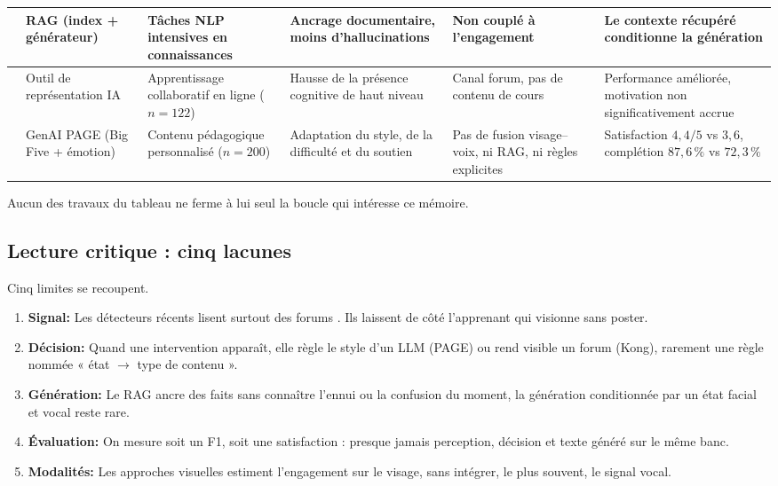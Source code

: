 {\begin{xltabular}{\textwidth}{|>{\raggedright\arraybackslash}X|>{\raggedright\arraybackslash}X|>{\raggedright\arraybackslash}X|>{\raggedright\arraybackslash}X|>{\raggedright\arraybackslash}X|>{\raggedright\arraybackslash}X|}
\textcite{lewis2020retrieval}
  & RAG (index + générateur)
  & Tâches NLP intensives en connaissances
  & Ancrage documentaire, moins d'hallucinations
  & Non couplé à l'engagement
  & Le contexte récupéré conditionne la génération \\
\hline
\textcite{kong2025exploratory}
  & Outil de représentation IA
  & Apprentissage collaboratif en ligne ($n=122$)
  & Hausse de la présence cognitive de haut niveau
  & Canal forum, pas de contenu de cours
  & Performance améliorée, motivation non significativement accrue \\
\hline
\textcite{hu2025page}
  & GenAI PAGE (Big Five + émotion)
  & Contenu pédagogique personnalisé ($n=200$)
  & Adaptation du style, de la difficulté et du soutien
  & Pas de fusion visage--voix, ni RAG, ni règles explicites
  & Satisfaction $4{,}4/5$ vs $3{,}6$, complétion $87{,}6\,\%$ vs $72{,}3\,\%$ \\
\hline
\end{xltabular}
\label{tab:ea-comparatif}
}

Aucun des travaux du tableau ne ferme à lui seul la boucle qui intéresse
ce mémoire.

\subsection*{Lecture critique : cinq lacunes}

Cinq limites se recoupent.

\begin{enumerate}[leftmargin=1.4em]
  \item \textbf{Signal:} Les détecteurs récents lisent surtout des forums
  \cite{liu2022automated,liu2023moocbert}. Ils laissent de côté
  l'apprenant qui visionne sans poster.
  \item \textbf{Décision:} Quand une intervention apparaît, elle règle le
  style d'un LLM (PAGE) ou rend visible un forum (Kong), rarement une
  règle nommée « état $\rightarrow$ type de contenu ».
  \item \textbf{Génération:} Le RAG ancre des faits
  \cite{lewis2020retrieval} sans connaître l'ennui ou la confusion du
  moment, la génération conditionnée par un état facial et vocal reste
  rare.
  \item \textbf{Évaluation:} On mesure soit un F1, soit une satisfaction :
  presque jamais perception, décision et texte généré sur le même banc.
  \item \textbf{Modalités:} Les approches visuelles
  \cite{whitehill2014faces,xiong2024cnntransformer} estiment
  l'engagement sur le visage, sans intégrer, le plus souvent, le
  signal vocal.
\end{enumerate}

